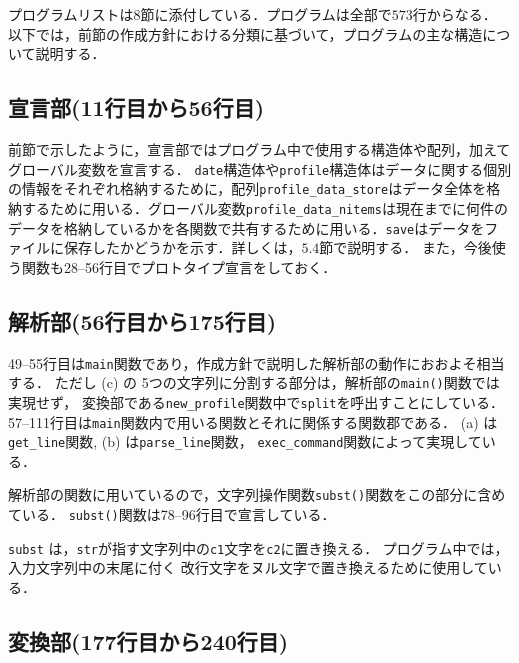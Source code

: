 \documentclass[a4paper,11pt]{jarticle}
\begin{document}
プログラムリストは$8$節に添付している．プログラムは全部で$573$行からなる．
以下では，前節の作成方針における分類に基づいて，プログラムの主な構造について説明する．

\subsection{宣言部(11行目から56行目)}

前節で示したように，宣言部ではプログラム中で使用する構造体や配列，加えてグローバル変数を宣言する．
\verb|date|構造体や\verb|profile|構造体はデータに関する個別の情報をそれぞれ格納するために，配列\verb|profile_data_store|はデータ全体を格納するために用いる．グローバル変数\verb|profile_data_nitems|は現在までに何件のデータを格納しているかを各関数で共有するために用いる．\verb|save|はデータをファイルに保存したかどうかを示す．詳しくは，$5.4$節で説明する．
また，今後使う関数も28--56行目でプロトタイプ宣言をしておく．

\subsection{解析部(56行目から175行目)}

49--55行目は\verb|main|関数であり，作成方針で説明した解析部の動作におおよそ相当する．
ただし (c) の 5つの文字列に分割する部分は，解析部の\verb|main()|関数では実現せず，
変換部である\verb|new_profile|関数中で\verb|split|を呼出すことにしている．
57--111行目は\verb|main|関数内で用いる関数とそれに関係する関数郡である．
(a) は　\verb|get_line|関数, (b) は\verb|parse_line|関数，
\verb|exec_command|関数によって実現している．

解析部の関数に用いているので，文字列操作関数\verb|subst()|関数をこの部分に含めている．
\verb|subst()|関数は78--96行目で宣言している．       

\verb|subst| は，\verb|str|が指す文字列中の\verb|c1|文字を\verb|c2|に置き換える．
プログラム中では，入力文字列中の末尾に付く
改行文字をヌル文字で置き換えるために使用している．

\subsection{変換部(177行目から240行目)}
\end{document}
